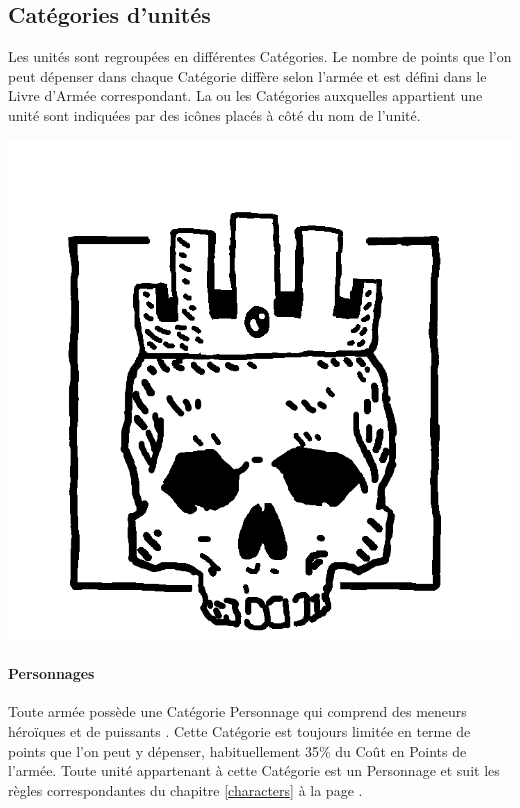 \subsection{Catégories d'unités}

Les unités sont regroupées en différentes Catégories. Le nombre de points que l'on peut dépenser dans chaque Catégorie diffère selon l'armée et est défini dans le Livre d'Armée correspondant. La ou les Catégories auxquelles appartient une unité sont indiquées par des icônes placés à côté du nom de l'unité.

\begin{minipage}[c]{0.17\textwidth}
\includegraphics[width=\textwidth]{../Layout/pics/logo_lord.png}
\end{minipage}\hfill
\begin{minipage}[c]{0.80\textwidth}
\paragraph{Personnages}

Toute armée possède une Catégorie Personnage qui comprend des meneurs héroïques et de puissants \expandafter\lowercase\expandafter{\wizards}. Cette Catégorie est toujours limitée en terme de points que l'on peut y dépenser, habituellement 35\% du Coût en Points de l'armée. Toute unité appartenant à cette Catégorie est un Personnage et suit les règles correspondantes du chapitre \ref{characters} à la page \pageref{characters}.
\end{minipage}

